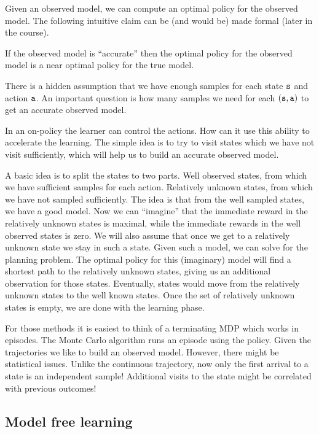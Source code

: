 Given an observed model, we can compute an optimal policy for the
observed model. The following intuitive claim can be (and would be)
made formal (later in the course).

\begin{claim}
If the observed model is ``accurate'' then the optimal policy for
the observed model is a near optimal policy for the true model.
\end{claim}

There is a hidden assumption that we have enough samples for each
state ${\tt s}$ and action ${\tt a}$. An important question is how
many samples we need for each $({\tt s},{\tt a})$ to get an accurate
observed model.

\medskip
{}
%
In an on-policy the learner can control the actions. How can it use
this ability to accelerate the learning. The simple idea is to try
to visit states which we have not visit sufficiently, which will
help us to build an accurate observed model.

A basic idea is to split the states to two parts. Well observed
states, from which we have sufficient samples for each action.
Relatively unknown states, from which we have not sampled
sufficiently. The idea is that from the well sampled states, we have
a good model. Now we can ``imagine'' that the immediate reward in
the relatively unknown states is maximal, while the immediate
rewards in the well observed states is zero. We will also assume
that once we get to a relatively unknown state we stay in such a
state. Given such a model, we can solve for the planning problem.
The optimal policy for this (imaginary) model will find a shortest
path to the relatively unknown states, giving us an additional
observation for those states. Eventually, states would move from the
relatively unknown states to the well known states. Once the set of
relatively unknown states is empty, we are done with the learning
phase.

\medskip
{}
%
For those methods it is easiest to think of a terminating MDP which
works in episodes.
%
The Monte Carlo algorithm runs an episode using the policy.
%
Given the trajectories we like  to build an observed model. However,
there might be statistical issues.
%
Unlike the continuous trajectory, now only the first arrival to a
state is an independent sample!
%
Additional visits to the state might be correlated with previous
outcomes!

\subsection{Model free learning}

